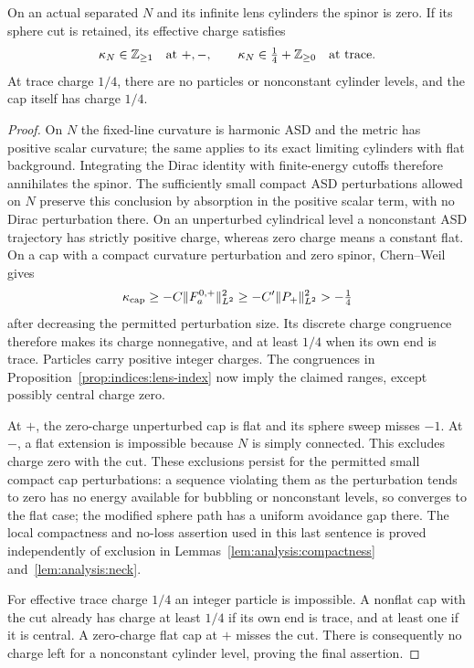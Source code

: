 \begin{lemma}\label{lem:indices:lens-charge}
On an actual separated $N$ and its infinite lens cylinders the spinor is
zero.  If its sphere cut is retained, its effective charge satisfies
\begin{equation}\label{eq:indices:lens-charge}
 \kappa_N\in\mathbb Z_{\ge1}\quad\text{at }+,-,
 \qquad
 \kappa_N\in\tfrac14+\mathbb Z_{\ge0}\quad\text{at trace}.
\end{equation}
At trace charge $1/4$, there are no particles or nonconstant cylinder
levels, and the cap itself has charge $1/4$.
\end{lemma}
\begin{proof}
On $N$ the fixed-line curvature is harmonic ASD and the metric has positive
scalar curvature; the same applies to its exact limiting cylinders with
flat background.  Integrating the Dirac identity with finite-energy
cutoffs therefore annihilates the spinor.  The sufficiently small compact
ASD perturbations allowed on $N$ preserve this conclusion by absorption
in the positive scalar term, with no Dirac perturbation there.
On an unperturbed cylindrical level a nonconstant ASD trajectory has
strictly positive charge, whereas zero charge means a constant flat.
On a cap with a compact curvature perturbation and zero spinor,
Chern--Weil gives
\[
 \kappa_{\rm cap}\ge-C\|F_a^{0,+}\|_{L^2}^2
                 \ge-C'\|P_+\|_{L^2}^2>-\tfrac14
\]
after decreasing the permitted perturbation size.  Its discrete charge
congruence therefore makes its charge nonnegative, and at least $1/4$
when its own end is trace.  Particles carry positive integer charges.
The congruences in
Proposition~\ref{prop:indices:lens-index} now imply the claimed ranges,
except possibly central charge zero.

At $+$, the zero-charge unperturbed cap is flat and its sphere sweep
misses $-1$.  At $-$, a flat extension is impossible because $N$ is simply
connected.  This excludes charge zero with the cut.  These exclusions
persist for the permitted small compact cap perturbations: a sequence
violating them as the perturbation tends to zero has no energy available
for bubbling or nonconstant levels, so converges to the flat case; the
modified sphere path has a uniform avoidance gap there.  The local
compactness and no-loss assertion used in this last sentence is proved
independently of exclusion in Lemmas~\ref{lem:analysis:compactness}
and~\ref{lem:analysis:neck}.

For effective trace charge $1/4$ an integer particle is impossible.  A
nonflat cap with the cut already has charge at least $1/4$ if its own end
is trace, and at least one if it is central.  A zero-charge flat cap at
$+$ misses the cut.  There is consequently no charge left for a
nonconstant cylinder level, proving the final assertion.
\end{proof}

